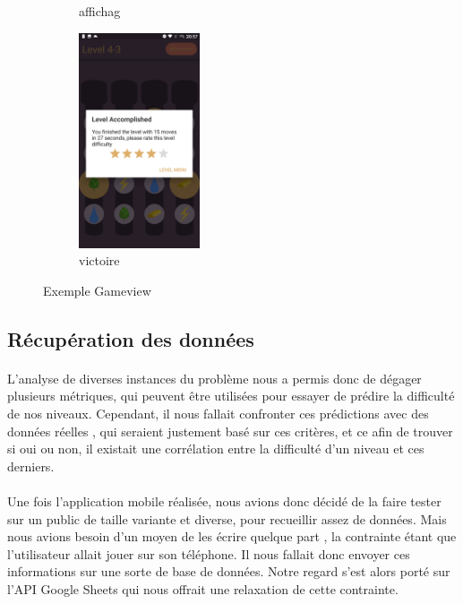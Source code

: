 \documentclass[a4paper, 10pt]{article}
\begin{document}
\begin{figure}[h!]
\begin{subfigure}[c]{0.23\textwidth}
        \caption{affichag}
    \end{subfigure}%
    \begin{subfigure}[d]{0.23\textwidth}
        \centering
        \includegraphics[height=2.5in]{g4}
        \caption{victoire}
    \end{subfigure}
    \caption{Exemple Gameview}
\end{figure}

	\subsection{Récupération des données}
	
	\paragraph{}
	L’analyse de diverses instances du problème nous a permis donc de dégager plusieurs métriques, qui peuvent être utilisées pour essayer de prédire la difficulté de nos niveaux. Cependant, il nous fallait confronter ces prédictions avec des données réelles , qui seraient justement basé sur ces critères, et ce afin de trouver si oui ou non, il existait une corrélation entre la difficulté d’un niveau et ces derniers. 
	\paragraph{}
Une fois l’application mobile réalisée, nous avions donc décidé de la faire tester sur un public de taille variante et diverse, pour recueillir assez de données. Mais nous avions besoin d’un moyen de les écrire quelque part , la contrainte étant que l’utilisateur allait jouer sur son téléphone. Il nous fallait donc envoyer ces informations sur une sorte de base de données. Notre regard s’est alors porté sur l’API Google Sheets qui nous offrait une relaxation de cette contrainte.
\end{document}
